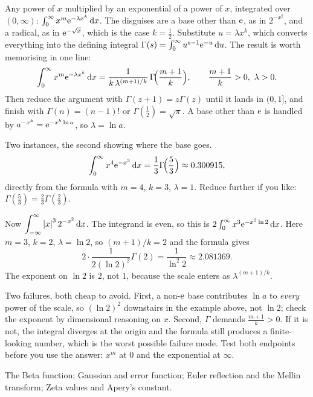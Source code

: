 \cue Any power of $x$ multiplied by an exponential of a power of $x$, integrated over $(0,\infty)$: $\int_0^{\infty}x^{m}\mathrm{e}^{-\lambda x^{k}}\,\mathrm{d} x$. The disguises are a base other than $\mathrm{e}$, as in $2^{-x^{2}}$, and a radical, as in $\mathrm{e}^{-\sqrt x}$, which is the case $k=\tfrac12$.
\method Substitute $u=\lambda x^{k}$, which converts everything into the defining integral $\Gamma(s)=\int_0^{\infty}u^{s-1}\mathrm{e}^{-u}\,\mathrm{d} u$. The result is worth memorising in one line:
\[\int_0^{\infty}x^{m}\mathrm{e}^{-\lambda x^{k}}\,\mathrm{d} x=\frac{1}{k\,\lambda^{(m+1)/k}}\,\Gamma\!\Bigl(\frac{m+1}{k}\Bigr),\qquad \frac{m+1}{k}>0,\ \lambda>0.\]
Then reduce the argument with $\Gamma(z+1)=z\Gamma(z)$ until it lands in $(0,1]$, and finish with $\Gamma(n)=(n-1)!$ or $\Gamma(\tfrac12)=\sqrt\pi$. A base other than $\mathrm{e}$ is handled by $a^{-x^{k}}=\mathrm{e}^{-x^{k}\ln a}$, so $\lambda=\ln a$.

\begin{worked}
Two instances, the second showing where the base goes.
\[\int_0^{\infty}x^{4}\mathrm{e}^{-x^{3}}\,\mathrm{d} x=\frac{1}{3}\Gamma\!\Bigl(\frac{5}{3}\Bigr)\approx0.300915,\]
directly from the formula with $m=4$, $k=3$, $\lambda=1$. Reduce further if you like: $\Gamma(\tfrac53)=\tfrac23\Gamma(\tfrac23)$.

Now $\displaystyle\int_{-\infty}^{\infty}\left\lvert x\right\rvert^{3}2^{-x^{2}}\,\mathrm{d} x$. The integrand is even, so this is $2\int_0^{\infty}x^{3}\mathrm{e}^{-x^{2}\ln2}\,\mathrm{d} x$. Here $m=3$, $k=2$, $\lambda=\ln2$, so $(m+1)/k=2$ and the formula gives
\[2\cdot\frac{1}{2(\ln2)^{2}}\Gamma(2)=\frac{1}{\ln^{2}2}\approx2.081369.\]
The exponent on $\ln2$ is $2$, not $1$, because the scale enters as $\lambda^{(m+1)/k}$.
\end{worked}

\begin{trap}
Two failures, both cheap to avoid. First, a non-$\mathrm{e}$ base contributes $\ln a$ to \emph{every} power of the scale, so $(\ln2)^{2}$ downstairs in the example above, not $\ln2$; check the exponent by dimensional reasoning on $x$. Second, $\Gamma$ demands $\tfrac{m+1}{k}>0$. If it is not, the integral diverges at the origin and the formula still produces a finite-looking number, which is the worst possible failure mode. Test both endpoints before you use the answer: $x^{m}$ at $0$ and the exponential at $\infty$.
\end{trap}

\begin{seealsob}The Beta function; Gaussian and error function; Euler reflection and the Mellin transform; Zeta values and Apery's constant.\end{seealsob}


